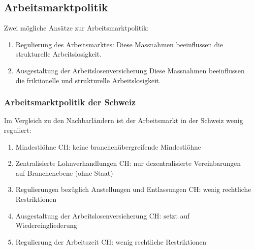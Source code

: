 \subsection{Arbeitsmarktpolitik}
Zwei mögliche Ansätze zur Arbeitsmarktpolitik:
\begin{enumerate}
	\item Regulierung des Arbeitsmarktes:
	\subitem Diese Massnahmen beeinflussen die strukturelle Arbeitslosigkeit.
	\item Ausgestaltung der Arbeitslosenversicherung
	\subitem Diese Massnahmen beeinflussen die friktionelle und strukturelle Arbeitslosigkeit.
\end{enumerate}

\subsubsection{Arbeitsmarktpolitik der Schweiz}
Im Vergleich zu den Nachbarländern ist der Arbeitsmarkt in der Schweiz wenig reguliert:
\begin{enumerate}
	\item Mindestlöhne
	\subitem CH: keine branchenübergreifende Mindestlöhne
	\item Zentralisierte Lohnverhandlungen
	\subitem CH: nur dezentralisierte Vereinbarungen auf Branchenebene (ohne Staat)
	\item Regulierungen bezüglich Anstellungen und Entlassungen
	\subitem CH: wenig rechtliche Restriktionen
	\item Ausgestaltung der Arbeitslosenversicherung
	\subitem CH: setzt auf Wiedereingliederung
	\item Regulierung der Arbeitszeit
	\subitem CH: wenig rechtliche Restriktionen
\end{enumerate}

